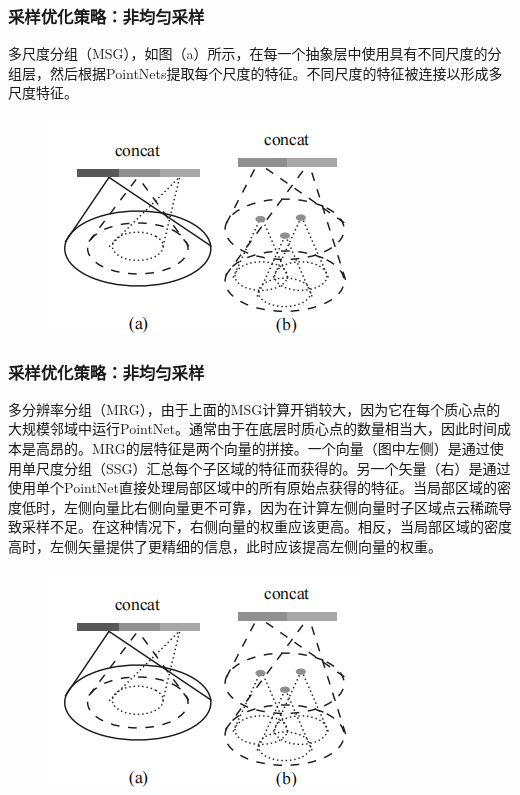 \begin{frame}
\frametitle{采样优化策略：非均匀采样}

多尺度分组（MSG），如图（a）所示，在每一个抽象层中使用具有不同尺度的分组层，然后根据PointNets提取每个尺度的特征。不同尺度的特征被连接以形成多尺度特征。

\begin{figure}
\includegraphics[scale=0.8]{doc/img/f3.png}
\end{figure}



\end{frame}

\begin{frame}
\frametitle{采样优化策略：非均匀采样}

多分辨率分组（MRG），由于上面的MSG计算开销较大，因为它在每个质心点的大规模邻域中运行PointNet。通常由于在底层时质心点的数量相当大，因此时间成本是高昂的。MRG的层特征是两个向量的拼接。一个向量（图中左侧）是通过使用单尺度分组（SSG）汇总每个子区域的特征而获得的。另一个矢量（右）是通过使用单个PointNet直接处理局部区域中的所有原始点获得的特征。当局部区域的密度低时，左侧向量比右侧向量更不可靠，因为在计算左侧向量时子区域点云稀疏导致采样不足。在这种情况下，右侧向量的权重应该更高。相反，当局部区域的密度高时，左侧矢量提供了更精细的信息，此时应该提高左侧向量的权重。


\begin{figure}
\includegraphics[scale=0.6]{doc/img/f3.png}
\end{figure}
    
    
\end{frame}


